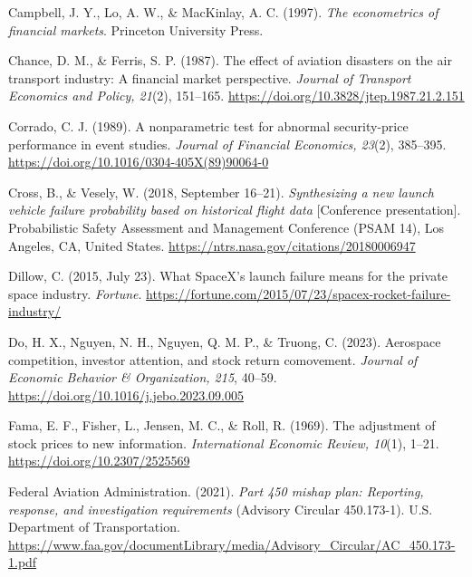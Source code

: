\documentclass[12pt,a4paper]{article}
\begin{document}
{\noindent\hypertarget{ref-campbell1997}{}\hangindent=0.5in Campbell, J. Y., Lo, A. W., \& MacKinlay, A. C. (1997). \emph{The econometrics of financial markets}. Princeton University Press.\par
\noindent\hypertarget{ref-chance1987}{}\hangindent=0.5in Chance, D. M., \& Ferris, S. P. (1987). The effect of aviation disasters on the air transport industry: A financial market perspective. \emph{Journal of Transport Economics and Policy, 21}(2), 151--165. \url{https://doi.org/10.3828/jtep.1987.21.2.151}\par
\noindent\hypertarget{ref-corrado1989}{}\hangindent=0.5in Corrado, C. J. (1989). A nonparametric test for abnormal security-price performance in event studies. \emph{Journal of Financial Economics, 23}(2), 385--395. \url{https://doi.org/10.1016/0304-405X(89)90064-0}\par
\noindent\hypertarget{ref-cross2018}{}\hangindent=0.5in Cross, B., \& Vesely, W. (2018, September 16--21). \emph{Synthesizing a new launch vehicle failure probability based on historical flight data} [Conference presentation]. Probabilistic Safety Assessment and Management Conference (PSAM 14), Los Angeles, CA, United States. \url{https://ntrs.nasa.gov/citations/20180006947}\par
\noindent\hypertarget{ref-dillow2015}{}\hangindent=0.5in Dillow, C. (2015, July 23). What SpaceX’s launch failure means for the private space industry. \emph{Fortune}. \url{https://fortune.com/2015/07/23/spacex-rocket-failure-industry/}\par
\noindent\hypertarget{ref-do2023}{}\hangindent=0.5in Do, H. X., Nguyen, N. H., Nguyen, Q. M. P., \& Truong, C. (2023). Aerospace competition, investor attention, and stock return comovement. \emph{Journal of Economic Behavior \& Organization, 215}, 40--59. \url{https://doi.org/10.1016/j.jebo.2023.09.005}\par
\noindent\hypertarget{ref-fama1969}{}\hangindent=0.5in Fama, E. F., Fisher, L., Jensen, M. C., \& Roll, R. (1969). The adjustment of stock prices to new information. \emph{International Economic Review, 10}(1), 1--21. \url{https://doi.org/10.2307/2525569}\par
\noindent\hypertarget{ref-faa2021}{}\hangindent=0.5in Federal Aviation Administration. (2021). \emph{Part 450 mishap plan: Reporting, response, and investigation requirements} (Advisory Circular 450.173-1). U.S. Department of Transportation. \url{https://www.faa.gov/documentLibrary/media/Advisory_Circular/AC_450.173-1.pdf}\par
}
\end{document}
